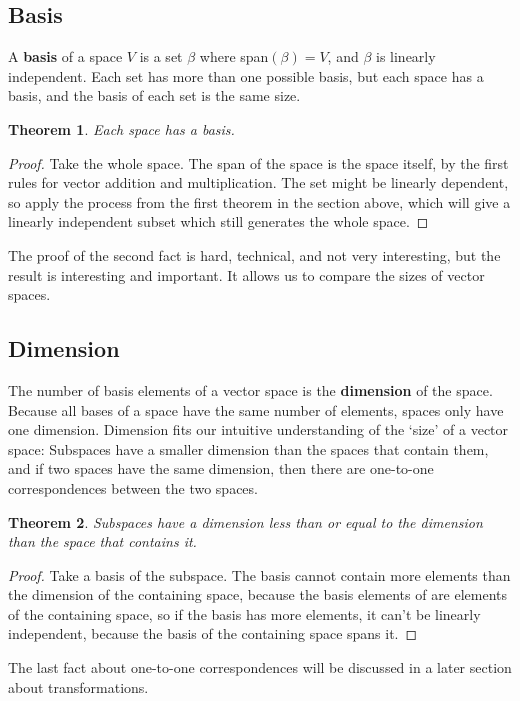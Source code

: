 \documentclass{article}
\newtheorem*{theorem}{Theorem}
\begin{document}
       \subsection{Basis}
           A \textbf{basis} of a space $V$ is a set $\beta$ where span$(\beta) = V$, and $\beta$ is linearly independent. Each set has more than one possible basis, but each space has a basis, and the basis of each set is the same size. 
           \begin{theorem}
               Each space has a basis.
           \end{theorem}
           \begin{proof}
               Take the whole space. The span of the space is the space itself, by the first rules for vector addition and multiplication. The set might be linearly dependent, so apply the process from the first theorem in the section above, which will give a linearly independent subset which still generates the whole space.
           \end{proof}
           The proof of the second fact is hard, technical, and not very interesting, but the result is interesting and important. It allows us to compare the sizes of vector spaces.
       \subsection{Dimension}
            The number of basis elements of a vector space is the \textbf{dimension} of the space. Because all bases of a space have the same number of elements, spaces only have one dimension. Dimension fits our intuitive understanding of the `size' of a vector space: Subspaces have a smaller dimension than the spaces that contain them, and if two spaces have the same dimension, then there are one-to-one correspondences between the two spaces. 
            \begin{theorem}
                Subspaces have a dimension less than or equal to the dimension than the space that contains it.
            \end{theorem}
            \begin{proof}
                Take a basis of the subspace. The basis cannot contain more elements than the dimension of the containing space, because the basis elements of are elements of the containing space, so if the basis has more elements, it can't be linearly independent, because the basis of the containing space spans it.
            \end{proof}
            The last fact about one-to-one correspondences will be discussed in a later section about transformations.
\end{document}
